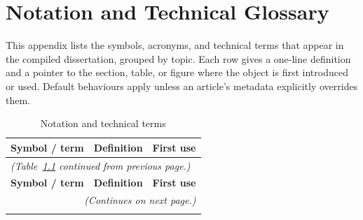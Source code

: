 \chapter{Notation and Technical Glossary}
\label{AppendixE}

This appendix lists the symbols, acronyms, and technical terms that appear in
the compiled dissertation, grouped by topic. Each row gives a one-line
definition and a pointer to the section, table, or figure where the object is
first introduced or used. Default behaviours apply unless an article's metadata
explicitly overrides them.

\begin{small}
\begin{longtable}{@{}p{3.5cm} p{9.5cm} p{2.0cm}@{}}
\caption{Notation and technical terms}
\label{tab:notation} \\
\toprule
\textbf{Symbol / term} & \textbf{Definition} & \textbf{First use} \\
\midrule
\endfirsthead

\multicolumn{3}{l}{\footnotesize\textit{(Table~\ref{tab:notation} continued from previous page.)}} \\
\toprule
\textbf{Symbol / term} & \textbf{Definition} & \textbf{First use} \\
\midrule
\endhead

\midrule
\multicolumn{3}{r}{\footnotesize\textit{(Continues on next page.)}} \\
\endfoot

\bottomrule
\endlastfoot


\end{longtable}
\end{small}
